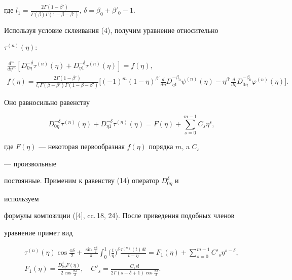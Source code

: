 где $l_1=\frac{2\Gamma(1-\beta')} 


{\Gamma(\beta)\Gamma(1-\beta-\beta')}$, $\delta=\beta_0+\beta'_0-1$. 


 


Используя условие склеивания (4), получим уравнение относительно 


$\tau^{(n)}(\eta)$: 


\begin{gather*} 


\frac{d^m}{d\eta^m}[D^{-\delta}_{0\eta}\tau^{(n)}(\eta)+ 


D^{-\delta}_{\eta1}\tau^{(n)}(\eta)]=f(\eta), \\ 


% 


f(\eta)=\frac{2\Gamma(1-\beta')} 


{l_1\Gamma(\beta+\beta')\Gamma(1-\beta-\beta')} 


\bigg[(-1)^m(1-\eta)^{\beta'}\frac{d}{d\eta} 


D^{-\beta_0}_{\eta1}\psi^{(n)}(\eta)-\eta^{\beta'} 


\frac{d}{d\eta}D^{-\beta_0}_{0\eta}\varphi^{(n)}(\eta)\bigg]. 


\end{gather*} 


Оно равносильно равенству 


\begin{equation} 


D^{-\delta}_{0\eta}\tau^{(n)}(\eta)+ 


D^{-\delta}_{\eta1}\tau^{(n)}(\eta)=F(\eta)+ 


\sum^{m-1}_{s=0}C_s \eta^s, 


\end{equation} 


где $F(\eta)$ --- некоторая первообразная $f(\eta)$ порядка $m$, a $C_s$ 


--- произвольные 


постоянные. Применим к равенству (14) оператор $D^\delta_{0\eta}$ и 


используем 


формулы композиции ([4], cc.\,18, 24). После приведения подобных членов 


уравнение примет вид 


\begin{gather*} 


\tau^{(n)}(\eta)\cos\frac{\pi\delta}{2} 


+\frac{\sin\frac{\pi\delta}{2}}{\pi}\int^1_0 


\bigg(\frac{t}{\eta} \bigg)^\delta 


\frac{\tau^{(n)}(t)dt}{t-\eta}=F_1(\eta)+ 


\sum^{m-1}_{s=0}C'_s \eta^{s-\delta}, \\ 


% 


F_1(\eta)=\frac{D^\delta_{0\eta}F(\eta)} 


{2\cos\frac{\pi\delta}{2}},\quad C'_s=\frac{C_s s!} 


{2\Gamma(s-\delta+1)\cos\frac{\pi\delta}{2}}. 


\end{gather*} 


